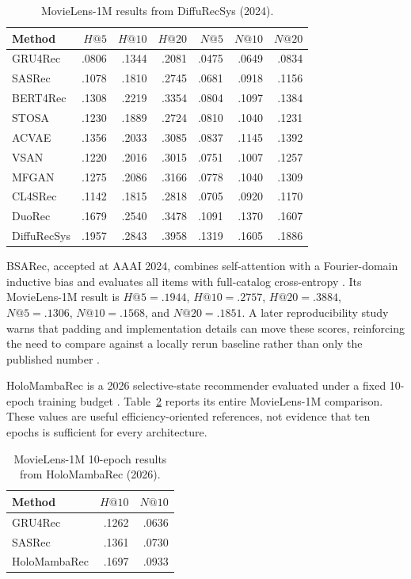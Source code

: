 \begin{table}[H]
\centering
\caption{MovieLens-1M results from DiffuRecSys (2024).}
\label{tab:diffurecsys-ml1m}
\footnotesize
\begin{tabular}{@{}lrrrrrr@{}}
\toprule
Method & $H@5$ & $H@10$ & $H@20$ & $N@5$ & $N@10$ & $N@20$ \\
\midrule
GRU4Rec & .0806 & .1344 & .2081 & .0475 & .0649 & .0834 \\
SASRec & .1078 & .1810 & .2745 & .0681 & .0918 & .1156 \\
BERT4Rec & .1308 & .2219 & .3354 & .0804 & .1097 & .1384 \\
STOSA & .1230 & .1889 & .2724 & .0810 & .1040 & .1231 \\
ACVAE & .1356 & .2033 & .3085 & .0837 & .1145 & .1392 \\
VSAN & .1220 & .2016 & .3015 & .0751 & .1007 & .1257 \\
MFGAN & .1275 & .2086 & .3166 & .0778 & .1040 & .1309 \\
CL4SRec & .1142 & .1815 & .2818 & .0705 & .0920 & .1170 \\
DuoRec & .1679 & .2540 & .3478 & .1091 & .1370 & .1607 \\
DiffuRecSys & .1957 & .2843 & .3958 & .1319 & .1605 & .1886 \\
\bottomrule
\end{tabular}
\end{table}

BSARec, accepted at AAAI 2024, combines self-attention with a Fourier-domain
inductive bias and evaluates all items with full-catalog cross-entropy
\cite{BSAREC}. Its MovieLens-1M result is $H@5=.1944$, $H@10=.2757$,
$H@20=.3884$, $N@5=.1306$, $N@10=.1568$, and $N@20=.1851$. A later
reproducibility study warns that padding and implementation details can move
these scores, reinforcing the need to compare against a locally rerun baseline
rather than only the published number \cite{BSARECREPRO}.

HoloMambaRec is a 2026 selective-state recommender evaluated under a fixed
10-epoch training budget \cite{HOLOMAMBA}. Table~\ref{tab:holo-ml1m} reports its
entire MovieLens-1M comparison. These values are useful efficiency-oriented
references, not evidence that ten epochs is sufficient for every architecture.

\begin{table}[H]
\centering
\caption{MovieLens-1M 10-epoch results from HoloMambaRec (2026).}
\label{tab:holo-ml1m}
\begin{tabular}{@{}lrr@{}}
\toprule
Method & $H@10$ & $N@10$ \\
\midrule
GRU4Rec & .1262 & .0636 \\
SASRec & .1361 & .0730 \\
HoloMambaRec & .1697 & .0933 \\
\bottomrule
\end{tabular}
\end{table}

